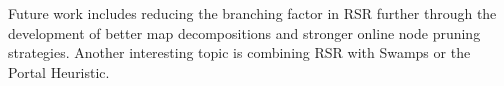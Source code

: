 
\par
Future work includes reducing the branching factor in RSR further through the 
development of better map decompositions and stronger online node pruning
strategies.
Another interesting topic is combining RSR with Swamps or the Portal Heuristic.


